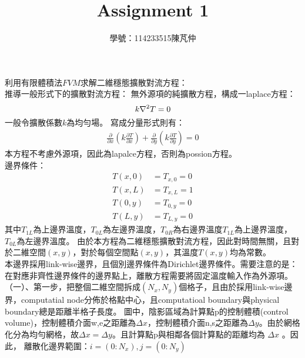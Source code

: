 \documentclass[12pt]{article}
\title{Assignment 1}
\author{學號：114233515陳芃仲\\}
\begin{document}
 
\maketitle 


\noindent 利用有限體積法$FVM$求解二維穩態擴散對流方程：\\
\noindent 推導一般形式下的擴散對流方程：
\noindent 無外源項的純擴散方程，構成一laplace方程：
\begin{equation}
    k\nabla^2 T= 0\\
\end{equation}
\noindent 一般令擴散係數$k$為均勻場。
\noindent 寫成分量形式則有：
\begin{equation}
    \begin{split}
        \frac{\partial }{\partial x}(k \frac{\partial T }{\partial x}) + \frac{\partial }{\partial y}(k \frac{\partial T }{\partial y}) = 0
    \end{split}
\end{equation}
\noindent 本方程不考慮外源項，因此為lapalce方程，否則為possion方程。\\
\noindent 邊界條件：
\begin{equation}
    \begin{split}
        T(x, 0) &= T_{x,0} = 0\\
        T(x, L) &= T_{x,L}= 1\\
        T(0, y) &= T_{0,y} = 0\\
        T(L, y) &= T_{L,y} = 0
    \end{split}
\end{equation}
\noindent 其中$T_{1L}$為上邊界溫度，$T_{0L}$為左邊界溫度，$T_{0R}$為右邊界溫度$T_{1L}$為上邊界溫度，$T_{0L}$為左邊界溫度。
\noindent 由於本方程為二維穩態擴散對流方程，因此對時間無關，且對於二維空間$(x,y)$，對於每個空間點$(x,y)$，其溫度$T(x,y)$均為常數。\\
\noindent 本邊界採用link-wise邊界，且個別邊界條件為Dirichlet邊界條件。需要注意的是：在對應非齊性邊界條件的邊界點上，離散方程需要將固定溫度輸入作為外源項。\\
\noindent （一）、第一步，把整個二維空間拆成$(N_x,N_y)$個格子，且由於採用link-wise邊界，computatial node分佈於格點中心，且computatioal boundary與physical boundary總是距離半格子長度。
圖中，陰影區域為計算點p的控制體積(control volume)，控制體積介面w,e之距離為$\Delta x$，控制體積介面n,s之距離為$\Delta y$。由於網格化分為均勻網格，故$\Delta x = \Delta y $。且計算點p與相鄰各個計算點的距離均為
$\Delta x$ 。因此， 離散化邊界範圍：$i = (0 : N_x) , j = (0 : N_y)$
\end{document}
